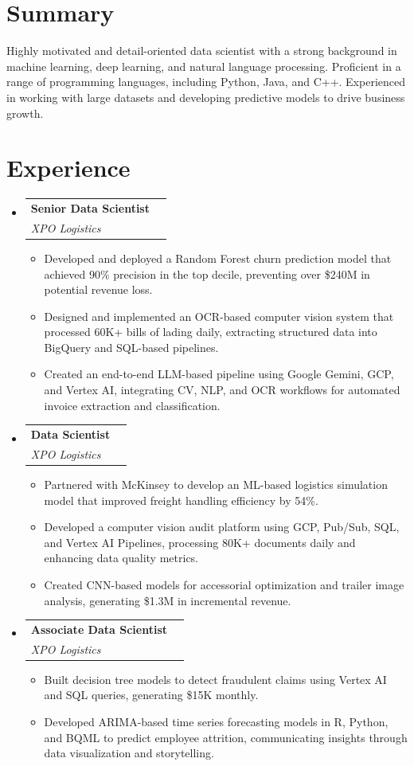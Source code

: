 \documentclass[letterpaper,11pt]{article}
\makeatletter
\newcommand{\resumeItem}[1]{
  \item\normalsize{
    {#1 \vspace{0pt}}
  }
}
\newcommand{\resumeSubheading}[4]{
  \vspace{-2pt}\item
    \begin{tabular*}{0.97\textwidth}[t]{l@{\extracolsep{\fill}}r}
      \textbf{#1} & #2 \\
      \textit{\small#3} & \textit{\small #4} \\
    \end{tabular*}\vspace{0pt}
}
\newcommand{\resumeSubHeadingListStart}{\begin{itemize}}
\newcommand{\resumeSubHeadingListEnd}{\end{itemize}\vspace{0pt}}
\newcommand{\resumeItemListStart}{\begin{itemize}}
\newcommand{\resumeItemListEnd}{\end{itemize}\vspace{0pt}}
\makeatother
\begin{document}
\section{Summary}
Highly motivated and detail-oriented data scientist with a strong background in machine learning, deep learning, and natural language processing. Proficient in a range of programming languages, including Python, Java, and C++. Experienced in working with large datasets and developing predictive models to drive business growth.

\vspace{-8pt}


\section{Experience}
\resumeSubHeadingListStart
\resumeSubheading
{Senior Data Scientist}{}
{XPO Logistics}{}
\resumeItemListStart
\resumeItem{Developed and deployed a Random Forest churn prediction model that achieved 90\% precision in the top decile, preventing over \$240M in potential revenue loss.}
\resumeItem{Designed and implemented an OCR-based computer vision system that processed 60K+ bills of lading daily, extracting structured data into BigQuery and SQL-based pipelines.}
\resumeItem{Created an end-to-end LLM-based pipeline using Google Gemini, GCP, and Vertex AI, integrating CV, NLP, and OCR workflows for automated invoice extraction and classification.}
\resumeItemListEnd
\resumeSubheading
{Data Scientist}{}
{XPO Logistics}{}
\resumeItemListStart
\resumeItem{Partnered with McKinsey to develop an ML-based logistics simulation model that improved freight handling efficiency by 54\%.}
\resumeItem{Developed a computer vision audit platform using GCP, Pub/Sub, SQL, and Vertex AI Pipelines, processing 80K+ documents daily and enhancing data quality metrics.}
\resumeItem{Created CNN-based models for accessorial optimization and trailer image analysis, generating \$1.3M in incremental revenue.}
\resumeItemListEnd
\resumeSubheading
{Associate Data Scientist}{}
{XPO Logistics}{}
\resumeItemListStart
\resumeItem{Built decision tree models to detect fraudulent claims using Vertex AI and SQL queries, generating \$15K monthly.}
\resumeItem{Developed ARIMA-based time series forecasting models in R, Python, and BQML to predict employee attrition, communicating insights through data visualization and storytelling.}
\resumeItemListEnd
\resumeSubHeadingListEnd
\vspace{-12pt}
\end{document}

